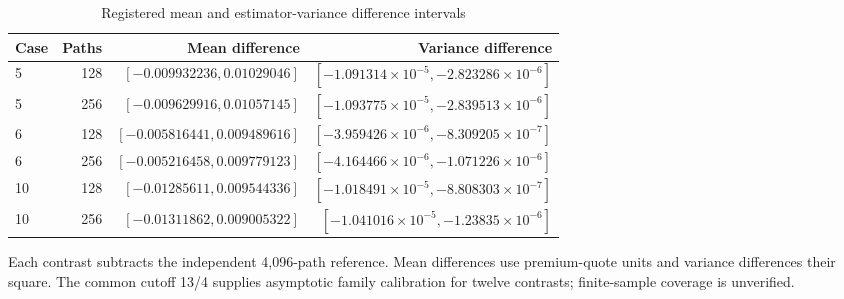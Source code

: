 \documentclass[11pt]{article}
\begin{document}
\begin{table}[htbp]
\centering\small
\caption{Registered mean and estimator-variance difference intervals}\label{tab:prospective-contrasts}
\setlength{\tabcolsep}{4pt}
\begin{tabular}{lrrr}
\toprule
Case & Paths & Mean difference & Variance difference \\
\midrule
5 & 128 & $[-0.009932236,0.01029046]$ & $[-1.091314\times10^{-5},-2.823286\times10^{-6}]$ \\
5 & 256 & $[-0.009629916,0.01057145]$ & $[-1.093775\times10^{-5},-2.839513\times10^{-6}]$ \\
6 & 128 & $[-0.005816441,0.009489616]$ & $[-3.959426\times10^{-6},-8.309205\times10^{-7}]$ \\
6 & 256 & $[-0.005216458,0.009779123]$ & $[-4.164466\times10^{-6},-1.071226\times10^{-6}]$ \\
10 & 128 & $[-0.01285611,0.009544336]$ & $[-1.018491\times10^{-5},-8.808303\times10^{-7}]$ \\
10 & 256 & $[-0.01311862,0.009005322]$ & $[-1.041016\times10^{-5},-1.23835\times10^{-6}]$ \\
\bottomrule
\end{tabular}
\par\smallskip\begin{minipage}{\textwidth}\footnotesize Each contrast subtracts the independent 4,096-path reference. Mean differences use premium-quote units and variance differences their square. The common cutoff 13/4 supplies asymptotic family calibration for twelve contrasts; finite-sample coverage is unverified.\end{minipage}
\end{table}
\end{document}
